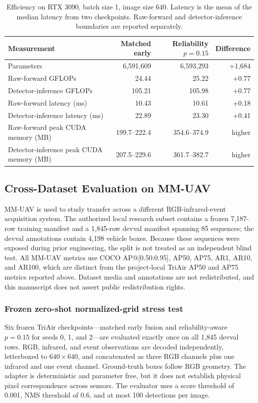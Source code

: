 \begin{table}[t]
\centering
\caption{Efficiency on RTX 3090, batch size 1, image size 640. Latency is the mean of the median latency from two checkpoints. Raw-forward and detector-inference boundaries are reported separately.}
\label{tab:efficiency}
\small
\begin{tabular}{@{}lrrr@{}}
\toprule
Measurement & Matched early & Reliability $p=0.15$ & Difference\\
\midrule
Parameters & 6,591,609 & 6,593,293 & +1,684\\
Raw-forward GFLOPs & 24.44 & 25.22 & +0.77\\
Detector-inference GFLOPs & 105.21 & 105.98 & +0.77\\
Raw-forward latency (ms) & 10.43 & 10.61 & +0.18\\
Detector-inference latency (ms) & 22.89 & 23.30 & +0.41\\
Raw-forward peak CUDA memory (MB) & 199.7--222.4 & 354.6--374.9 & higher\\
Detector-inference peak CUDA memory (MB) & 207.5--229.6 & 361.7--382.7 & higher\\
\bottomrule
\end{tabular}
\end{table}

\subsection{Cross-Dataset Evaluation on MM-UAV}
\label{sec:mmuav}
MM-UAV \cite{xu2025mmuav} is used to study transfer across a different RGB-infrared-event acquisition system. The authorized local research subset contains a frozen 7,187-row training manifest and a 1,845-row devval manifest spanning 85 sequences; the devval annotations contain 4,198 vehicle boxes. Because these sequences were exposed during prior engineering, the split is not treated as an independent blind test. All MM-UAV metrics use COCO AP@[0.50:0.95], AP50, AP75, AR1, AR10, and AR100, which are distinct from the project-local TriAir AP50 and AP75 metrics reported above. Dataset media and annotations are not redistributed, and this manuscript does not assert public redistribution rights.

\subsubsection{Frozen zero-shot normalized-grid stress test}
Six frozen TriAir checkpoints---matched early fusion and reliability-aware $p=0.15$ for seeds 0, 1, and 2---are evaluated exactly once on all 1,845 devval rows. RGB, infrared, and event observations are decoded independently, letterboxed to $640\times640$, and concatenated as three RGB channels plus one infrared and one event channel. Ground-truth boxes follow RGB geometry. The adapter is deterministic and parameter free, but it does not establish physical pixel correspondence across sensors. The evaluator uses a score threshold of 0.001, NMS threshold of 0.6, and at most 100 detections per image.

